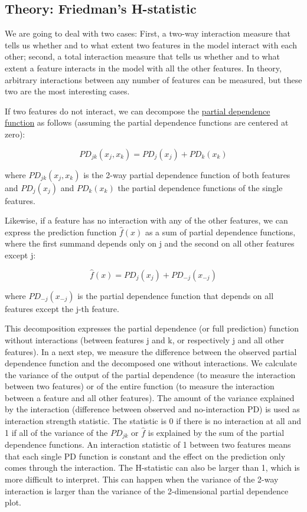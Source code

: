 \documentclass[12pt,]{krantz}
\begin{document}
\subsection{Theory: Friedman's
H-statistic}\label{theory-friedmans-h-statistic}

We are going to deal with two cases: First, a two-way interaction
measure that tells us whether and to what extent two features in the
model interact with each other; second, a total interaction measure that
tells us whether and to what extent a feature interacts in the model
with all the other features. In theory, arbitrary interactions between
any number of features can be measured, but these two are the most
interesting cases.

If two features do not interact, we can decompose the
\protect\hyperlink{pdp}{partial dependence function} as follows
(assuming the partial dependence functions are centered at zero):

\[PD_{jk}(x_j,x_k)=PD_j(x_j)+PD_k(x_k)\]

where \(PD_{jk}(x_j,x_k)\) is the 2-way partial dependence function of
both features and \(PD_j(x_j)\) and \(PD_k(x_k)\) the partial dependence
functions of the single features.

Likewise, if a feature has no interaction with any of the other
features, we can express the prediction function \(\hat{f}(x)\) as a sum
of partial dependence functions, where the first summand depends only on
j and the second on all other features except j:

\[\hat{f}(x)=PD_j(x_j)+PD_{-j}(x_{-j})\]

where \(PD_{-j}(x_{-j})\) is the partial dependence function that
depends on all features except the j-th feature.

This decomposition expresses the partial dependence (or full prediction)
function without interactions (between features j and k, or respectively
j and all other features). In a next step, we measure the difference
between the observed partial dependence function and the decomposed one
without interactions. We calculate the variance of the output of the
partial dependence (to measure the interaction between two features) or
of the entire function (to measure the interaction between a feature and
all other features). The amount of the variance explained by the
interaction (difference between observed and no-interaction PD) is used
as interaction strength statistic. The statistic is 0 if there is no
interaction at all and 1 if all of the variance of the \(PD_{jk}\) or
\(\hat{f}\) is explained by the sum of the partial dependence functions.
An interaction statistic of 1 between two features means that each
single PD function is constant and the effect on the prediction only
comes through the interaction. The H-statistic can also be larger than
1, which is more difficult to interpret. This can happen when the
variance of the 2-way interaction is larger than the variance of the
2-dimensional partial dependence plot.
\end{document}
